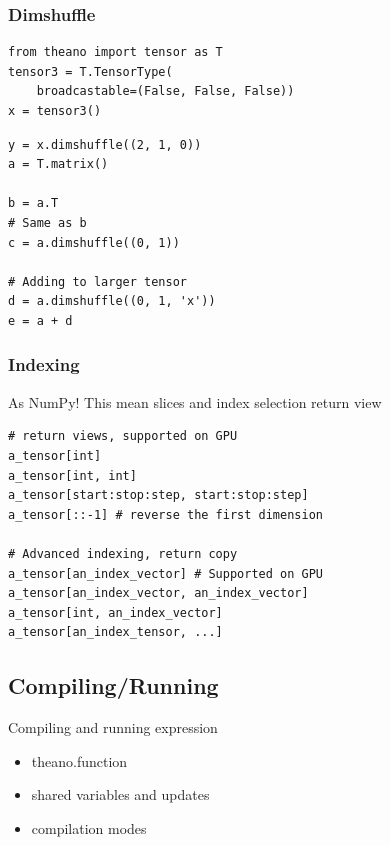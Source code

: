 \documentclass[utf8x,xcolor=pdftex,dvipsnames,table]{beamer}
\begin{document}
\begin{frame}[fragile]
  \frametitle{Dimshuffle}

\begin{lstlisting}
from theano import tensor as T
tensor3 = T.TensorType(
    broadcastable=(False, False, False))
x = tensor3()
\end{lstlisting}
\begin{lstlisting}
y = x.dimshuffle((2, 1, 0))
a = T.matrix()

b = a.T
# Same as b
c = a.dimshuffle((0, 1))

# Adding to larger tensor
d = a.dimshuffle((0, 1, 'x'))
e = a + d
\end{lstlisting}
\end{frame}

\begin{frame}[fragile]
  \frametitle{Indexing}
  As NumPy!
  This mean slices and index selection return view
\begin{lstlisting}
# return views, supported on GPU
a_tensor[int]
a_tensor[int, int]
a_tensor[start:stop:step, start:stop:step]
a_tensor[::-1] # reverse the first dimension

# Advanced indexing, return copy
a_tensor[an_index_vector] # Supported on GPU
a_tensor[an_index_vector, an_index_vector]
a_tensor[int, an_index_vector]
a_tensor[an_index_tensor, ...]
\end{lstlisting}
\end{frame}

\subsection{Compiling/Running}
\begin{frame}{Compiling and running expression}
  \begin{itemize}
  \item theano.function
  \item shared variables and updates
  \item compilation modes
  \end{itemize}
\end{frame}
\end{document}
